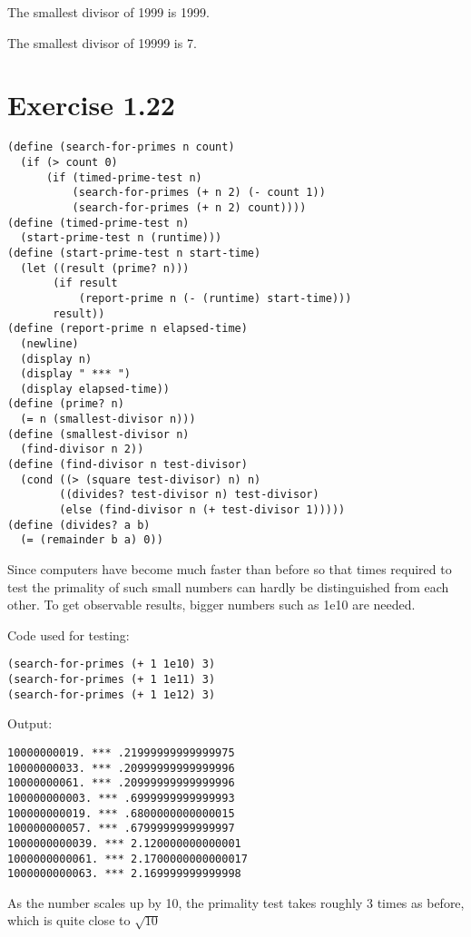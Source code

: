 \documentclass[../main.tex]{subfiles}
\begin{document}
The smallest divisor of 1999 is 1999.

The smallest divisor of 19999 is 7.

\section{Exercise 1.22}

\begin{lstlisting}
(define (search-for-primes n count)
  (if (> count 0)
      (if (timed-prime-test n)
          (search-for-primes (+ n 2) (- count 1))
          (search-for-primes (+ n 2) count))))
(define (timed-prime-test n)
  (start-prime-test n (runtime)))
(define (start-prime-test n start-time)
  (let ((result (prime? n)))
       (if result
           (report-prime n (- (runtime) start-time)))
       result))
(define (report-prime n elapsed-time)
  (newline)
  (display n)
  (display " *** ")
  (display elapsed-time))
(define (prime? n)
  (= n (smallest-divisor n)))
(define (smallest-divisor n)
  (find-divisor n 2))
(define (find-divisor n test-divisor)
  (cond ((> (square test-divisor) n) n)
        ((divides? test-divisor n) test-divisor)
        (else (find-divisor n (+ test-divisor 1)))))
(define (divides? a b)
  (= (remainder b a) 0))
\end{lstlisting}

Since computers have become much faster than before so that
 times required to test the primality of such small numbers
 can hardly be distinguished from each other. To get observable
 results, bigger numbers such as 1e10 are needed.

Code used for testing:

\begin{lstlisting}
(search-for-primes (+ 1 1e10) 3)
(search-for-primes (+ 1 1e11) 3)
(search-for-primes (+ 1 1e12) 3)
\end{lstlisting}

Output:

\begin{lstlisting}
10000000019. *** .21999999999999975
10000000033. *** .20999999999999996
10000000061. *** .20999999999999996
100000000003. *** .6999999999999993
100000000019. *** .6800000000000015
100000000057. *** .6799999999999997
1000000000039. *** 2.120000000000001
1000000000061. *** 2.1700000000000017
1000000000063. *** 2.169999999999998
\end{lstlisting}

As the number scales up by 10, the primality
 test takes roughly 3 times as before, which is
 quite close to $\sqrt{10}$
\end{document}
